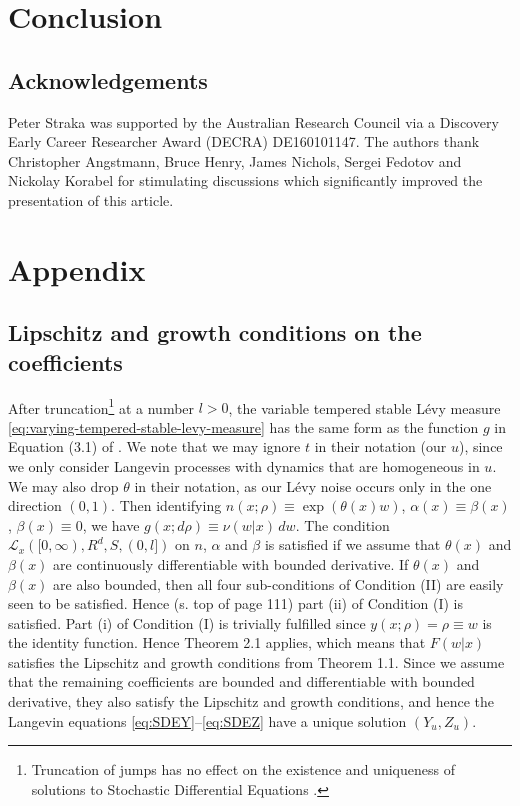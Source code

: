 \documentclass[a4paper,12pt]{article}
\numberwithin{equation}{section}
\theoremstyle{plain}
\theoremstyle{definition}
\theoremstyle{remark}
\numberwithin{equation}{section}
\newcommand{\1}{\mathbf 1}
\begin{document}
\section{Conclusion}

\subsection*{Acknowledgements}
Peter Straka was supported by the Australian Research Council via a 
Discovery Early Career Researcher Award (DECRA) DE160101147. 
The authors thank Christopher Angstmann, Bruce Henry, James Nichols, 
Sergei Fedotov and Nickolay Korabel for stimulating discussions which 
significantly improved the presentation of this article. 




\appendix

\section{Appendix}

\subsection{Lipschitz and growth conditions on the coefficients} 
\label{subsec:Lip-gro}
After truncation\footnote{Truncation of jumps has no effect on the existence and 
uniqueness of solutions to Stochastic Differential Equations \cite{Applebaum}.} 
at a number $l > 0$, the variable tempered stable L\'evy 
measure 
\eqref{eq:varying-tempered-stable-levy-measure}
has the same form as the function $g$ in Equation (3.1) of 
\cite{Tsuchiya1992}.  
We note that we may ignore $t$ in their notation (our $u$), since we only 
consider Langevin processes with dynamics that are homogeneous in $u$.
We may also drop $\theta$ in their notation, as our L\'evy noise occurs only 
in the one direction $(0,1)$. 
Then identifying $n(x;\rho) \equiv \exp(\theta(x) w)$, 
$\alpha(x) \equiv \beta(x)$, $\beta(x) \equiv 0$, 
we have $g(x;d\rho) \equiv \nu(w|x)\,dw$. 
The condition $\mathcal L_x([0,\infty), R^d, S, (0,l])$ on $n$, $\alpha$ and 
$\beta$ is satisfied if we assume that $\theta(x)$ and $\beta(x)$ are 
continuously differentiable with bounded derivative. 
If $\theta(x)$ and $\beta(x)$ are also bounded, then all four sub-conditions of 
Condition (II) are easily seen to be satisfied.  
Hence (s. top of page 111) part (ii) of Condition (I) is satisfied. 
Part (i) of Condition (I) is trivially fulfilled since 
$y(x; \rho) = \rho \equiv w$ is the identity function. 
Hence Theorem 2.1 applies, which means that $F(w|x)$ satisfies the Lipschitz 
and growth conditions from Theorem 1.1. 
Since we assume that the remaining coefficients are bounded and differentiable 
with bounded derivative, they also satisfy the Lipschitz and growth conditions, 
and hence the Langevin equations \eqref{eq:SDEY}--\eqref{eq:SDEZ} have a unique 
solution $(Y_u, Z_u)$.
\end{document}
